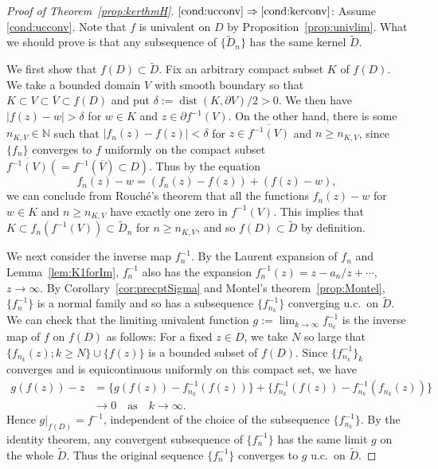 \documentclass[preprint,12pt]{elsarticle}
\theoremstyle{definition}
\newcommand{\N}{\mathbb{N}}
\DeclareMathOperator{\dist}{dist}
\begin{document}
\begin{proof}[Proof of Theorem~\ref{prop:kerthmH}]
\noindent
$\eqref{cond:ucconv} \Rightarrow \eqref{cond:kerconv}$:
Assume \eqref{cond:ucconv}.
Note that $f$ is univalent on $D$ by Proposition~\ref{prop:univlim}.
What we should prove is that any subsequence of $\{\tilde{D}_n\}$
has the same kernel $\tilde{D}$.

We first show that $f(D) \subset \tilde{D}$.
Fix an arbitrary compact subset $K$ of $f(D)$.
We take a bounded domain $V$ with smooth boundary so that
$K \subset V \subset \overline{V} \subset f(D)$ and
put $\delta:=\dist(K, \partial V)/2>0$.
We then have $\lvert f(z)-w \rvert > \delta$ for $w \in K$ and
$z \in \partial f^{-1}(V)$.
On the other hand, there is some $n_{K, V} \in \N$ such that
$\lvert f_n(z)-f(z) \rvert < \delta$ for $z \in \overline{f^{-1}(V)}$ and
$n \geq n_{K, V}$, since $\{f_n\}$ converges to $f$ uniformly
on the compact subset $\overline{f^{-1}(V)}(=f^{-1}(\overline{V}) \subset D)$.
Thus by the equation
\[
f_n(z)-w = (f_n(z)-f(z)) + (f(z)-w),
\]
we can conclude from Rouch\'e's theorem that all the functions $f_n(z)-w$
for $w \in K$ and $n \geq n_{K, V}$ have exactly one zero in $f^{-1}(V)$.
This implies that $K \subset f_n(f^{-1}(V)) \subset \tilde{D}_n$
for $n \geq n_{K, V}$, and so $f(D) \subset \tilde{D}$ by definition.

We next consider the inverse map $f_n^{-1}$.
By the Laurent expansion of $f_n$ and Lemma~\ref{lem:K1forIm},
$f_n^{-1}$ also has the expansion $f_n^{-1}(z)=z-a_n/z+\cdots$, $z \to \infty$.
By Corollary~\ref{cor:precptSigma} and Montel's theorem~\ref{prop:Montel},
$\{f_n^{-1}\}$ is a normal family and so
has a subsequence $\{f_{n_k}^{-1}\}$ converging u.c.\ on $\tilde{D}$.
We can check that the limiting univalent function $g:=\lim_{k \to \infty}f_{n_k}^{-1}$
is the inverse map of $f$ on $f(D)$ as follows:
For a fixed $z \in D$, we take $N$ so large that
$\{f_{n_k}(z); k \geq N\} \cup \{f(z)\}$ is a bounded subset of $f(D)$.
Since $\{f_{n_k}^{-1}\}_k$ converges and is equicontinuous
uniformly on this compact set, we have
\begin{align*}
g(f(z))-z&=\{g(f(z))-f_{n_k}^{-1}(f(z))\}+\{f_{n_k}^{-1}(f(z))-f_{n_k}^{-1}(f_{n_k}(z))\} \\
&\to 0 \quad \text{as} \quad k \to \infty.
\end{align*}
Hence $g|_{f(D)}=f^{-1}$, independent of the choice
of the subsequence $\{f_{n_k}^{-1}\}$.
By the identity theorem, any convergent subsequence of $\{f_n^{-1}\}$
has the same limit $g$ on the whole $\tilde{D}$.
Thus the original sequence $\{f_n^{-1}\}$ converges to $g$ u.c.\ on $\tilde{D}$.


\end{proof}
\end{document}
